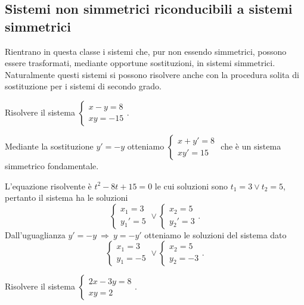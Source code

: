 \subsection{Sistemi non simmetrici riconducibili a sistemi simmetrici}

Rientrano in questa classe i sistemi che, pur non essendo simmetrici, possono essere trasformati, mediante opportune sostituzioni, in sistemi simmetrici. Naturalmente questi sistemi si possono risolvere anche con la procedura solita di sostituzione per i sistemi di secondo grado.

\begin{exrig}
\begin{esempio}
Risolvere il sistema $\left\{\begin{array}{l}{x-y=8}\\{{xy}=-15}\end{array}\right.$.

Mediante la sostituzione $y'=-y$ otteniamo $\left\{\begin{array}{l}{x+y'=8}\\{xy'=15}\end{array}\right.$ che è un sistema simmetrico fondamentale.

L'equazione risolvente è $t^2-8t+15=0$ le cui soluzioni sono $t_1=3\vee t_2=5$, pertanto il sistema ha le soluzioni 
\[\left\{\begin{array}{l}{x_1=3}\\
{{y_1}'=5}\end{array}\right.\vee 
\left\{\begin{array}{l}{x_2=5}\\
{{y_2}'=3}\end{array}\right..\] 
Dall'uguaglianza $y'=-y\:\Rightarrow\: y=-y'$ otteniamo le soluzioni del sistema dato 
\[\left\{\begin{array}{l}{x_1=3}\\
{y_1=-5}\end{array}\right.\vee 
\left\{\begin{array}{l}{x_2=5}\\
{y_2=-3}\end{array}\right..\]
\end{esempio}

\begin{esempio}
Risolvere il sistema $\left\{\begin{array}{l}{2x-3y=8}\\{{xy}=2}\end{array}\right.$.


\end{esempio}
\end{exrig}
